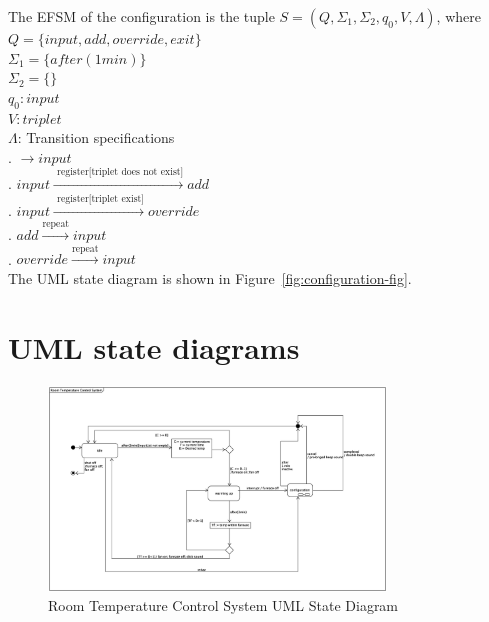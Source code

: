 \documentclass[12pt]{article}
\begin{document}
\begin{spacing}{1.5}
\noindent The EFSM of the configuration is the tuple $S = (Q, \Sigma_1, \Sigma_2, q_0, V, \Lambda)$, where\\
\noindent $Q = \{input, add, override, exit\}$\\
\noindent $\Sigma_1 = \{after(1 min)\}$\\
\noindent $\Sigma_2 = \{\}$\\
\noindent $q_0: input$\\
\noindent $V: triplet$\\
\noindent $\Lambda$: Transition specifications\\
. $\rightarrow input$\\
. $input \xrightarrow {\text { register[triplet does not exist]}} add$\\
. $input \xrightarrow {\text { register[triplet exist]}} override$\\
. $add \xrightarrow {\text {repeat}} input$\\
. $override \xrightarrow {\text {repeat}} input$\\

\noindent The UML state diagram is shown in Figure~\ref{fig:configuration-fig}.

\newpage

\section{UML state diagrams}

\begin{figure}[h!]
	\centering
		\includegraphics[width=0.8\textwidth]{./figures/eps/SystemEFSM.eps}
		  \caption{Room Temperature Control System UML State Diagram}
  \label{fig:system-fig}
\end{figure}


\end{spacing}
\end{document}
